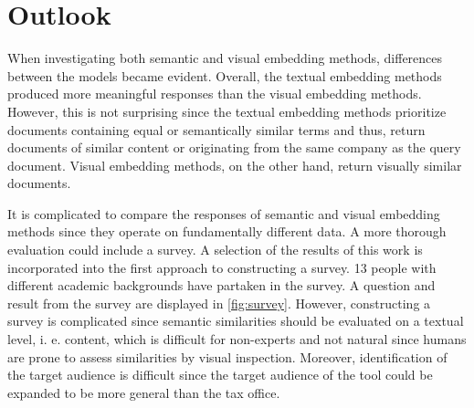 \section{Outlook}\label{sec:outlook}

When investigating both semantic and visual embedding methods, differences between the models became evident.
Overall, the textual embedding methods produced more meaningful responses than the visual embedding methods.
However, this is not surprising since the textual embedding methods prioritize documents containing equal or semantically similar terms and thus,
return documents of similar content or originating from the same company as the query document.
Visual embedding methods, on the other hand, return visually similar documents.

It is complicated to compare the responses of semantic and visual embedding methods since they operate on fundamentally different data.
A more thorough evaluation could include a survey.
A selection of the results of this work is incorporated into the first approach to constructing a survey.
13 people with different academic backgrounds have partaken in the survey.
A question and result from the survey are displayed in \autoref{fig:survey}.
However, constructing a survey is complicated since semantic similarities should be evaluated on a textual level, i. e. content, 
which is difficult for non-experts and not natural since humans are prone to assess similarities by visual inspection.
Moreover, identification of the target audience is difficult since the target audience of the tool could be expanded to be more general than the tax office.

